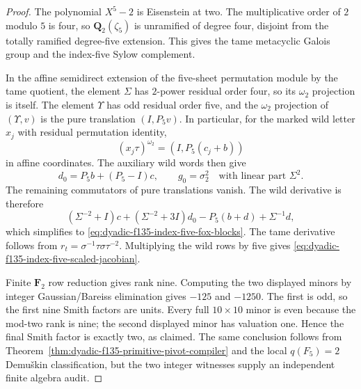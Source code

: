 \documentclass[11pt]{article}
\theoremstyle{definition}
\begin{document}
\begin{proof}
The polynomial
$X^5-2$ is
Eisenstein at
two.  The
multiplicative
order of $2$
modulo $5$
is four, so
$\mathbf Q_2(\zeta_5)$
is unramified
of degree four,
disjoint from
the totally ramified
degree-five
extension.
This gives
the tame metacyclic
Galois group and
the index-five
Sylow complement.

In the affine
semidirect extension
of the five-sheet
permutation module
by the tame quotient,
the element $\Sigma$
has $2$-power
residual order four,
so its $\omega_2$
projection is itself.
The element
$\Upsilon$ has
odd residual order
five, and the
$\omega_2$
projection of
$(\Upsilon,v)$
is the pure
translation
$(I,P_5v)$.
In particular,
for the marked
wild letter $x_j$
with residual
permutation identity,
\[
(x_j\tau)^{\omega_2}
=(I,P_5(c_j+b))
\]
in affine coordinates.
The auxiliary wild
words then give
\[
d_0=P_5b+(P_5-I)c,\qquad
g_0=\sigma_2^2
\quad\text{with
linear part }\Sigma^2.
\]
The remaining
commutators of
pure translations
vanish.
The wild
derivative is
therefore
\[
(\Sigma^{-2}+I)c+
(\Sigma^{-2}+3I)d_0
-P_5(b+d)
+\Sigma^{-1}d,
\]
which simplifies
to
\eqref{eq:dyadic-f135-index-five-fox-blocks}.
The tame
derivative follows
from
$r_t=\sigma^{-1}\tau
\sigma\tau^{-2}$.
Multiplying
the wild rows by
five gives
\eqref{eq:dyadic-f135-index-five-scaled-jacobian}.

Finite
$\mathbf F_2$
row reduction
gives rank nine.
Computing the
two displayed
minors by
integer
Gaussian/Bareiss
elimination gives
$-125$ and
$-1250$.
The first is odd,
so the first nine
Smith factors
are units.
Every full
$10\times10$
minor is even
because the
mod-two rank
is nine;
the second
displayed minor
has valuation
one.
Hence the final
Smith factor is
exactly two,
as claimed.
The same conclusion
follows from
Theorem~\ref{thm:dyadic-f135-primitive-pivot-compiler}
and the local
$q(F_5)=2$
Demu\v{s}kin
classification,
but the two
integer witnesses
supply an
independent
finite algebra
audit.
\end{proof}
\end{document}
